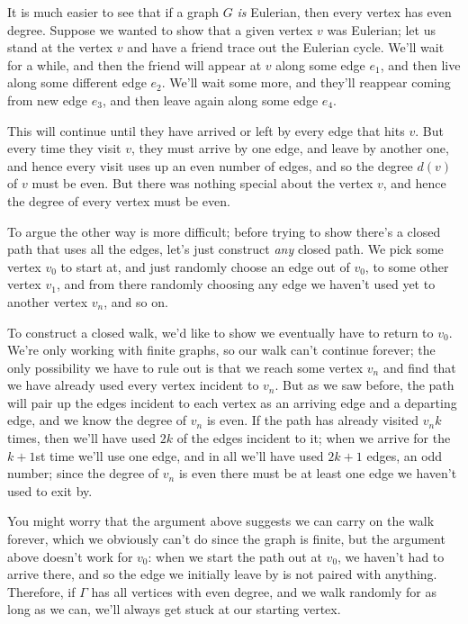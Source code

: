 \documentclass[10pt,]{book}
\theoremstyle{plain}
\theoremstyle{definition}
\theoremstyle{definition}
\theoremstyle{definition}
\theoremstyle{definition}
\numberwithin{equation}{section}
\begin{document}
\par
\hypertarget{p-129}{}%
It is much easier to see that if a graph \(G\) \emph{is} Eulerian, then every vertex has even degree.  Suppose we wanted to show that a given vertex \(v\) was Eulerian; let us stand at the vertex \(v\) and have a friend trace out the Eulerian cycle.  We'll wait for a while, and then the friend will appear at \(v\) along some edge \(e_1\), and then live along some different edge \(e_2\).  We'll wait some more, and they'll reappear coming from new edge \(e_3\), and then leave again along some edge \(e_4\).%
\par
\hypertarget{p-130}{}%
This will continue until they have arrived or left by every edge that hits \(v\).  But every time they visit \(v\), they must arrive by one edge, and leave by another one, and hence every visit uses up an even number of edges, and so the degree \(d(v)\) of \(v\) must be even.  But there was nothing special about the vertex \(v\), and hence the degree of every vertex must be even.%
\par
\hypertarget{p-131}{}%
To argue the other way is more difficult; before trying to show there's a closed path that uses all the edges, let's just construct \emph{any} closed path.  We pick some vertex \(v_0\) to start at, and just randomly choose an edge out of \(v_0\), to some other vertex \(v_1\), and from there randomly choosing any edge we haven't used yet to another vertex \(v_n\), and so on.%
\par
\hypertarget{p-132}{}%
To construct a closed walk, we'd like to show we eventually have to return to \(v_0\).  We're only working with finite graphs, so our walk can't continue forever; the only possibility we have to rule out is that we reach some vertex \(v_n\) and find that we have already used every vertex incident to \(v_n\).  But as we saw before, the path will pair up the edges incident to each vertex as an arriving edge and a departing edge, and we know the degree of \(v_n\) is even.  If the path has already visited \(v_n k\) times, then we'll have used \(2k\) of the edges incident to it; when we arrive for the \(k+1\)st time we'll use one edge, and in all we'll have used \(2k+1\) edges, an odd number; since the degree of \(v_n\) is even there must be at least one edge we haven't used to exit by.%
\par
\hypertarget{p-133}{}%
You might worry that the argument above suggests we can carry on the walk forever, which we obviously can't do since the graph is finite, but the argument above doesn't work for \(v_0\): when we start the path out at \(v_0\), we haven't had to arrive there, and so the edge we initially leave by is not paired with anything.  Therefore, if \(\Gamma\) has all vertices with even degree, and we walk randomly for as long as we can, we'll always get stuck at our starting vertex.%
\end{document}
